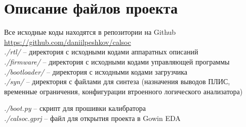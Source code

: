 \chapter{Описание файлов проекта}\label{appendix-extra-examples}%

Все исходные коды находятся в репозитории на Github \url{https://github.com/daniilpeshkov/calsoc}\\

\noindent \emph{./rtl/} -- директория с исходными кодами аппаратных описаний\\
\noindent \emph{./firmware/} -- директория с исходными кодами управляющей программы\\
\noindent \emph{./bootloader/} -- директория с исходными кодами загрузчика\\
\noindent \emph{./syn/} -- директория с файлами для синтеза (назначения выводов ПЛИС, временные ограничения, конфигурации втроенного
логического анализатора)

\noindent \emph{./boot.py} -- скрипт для прошивки калибратора\\
\noindent \emph{./calsoc.gprj} -- файл для открытия проекта в Gowin EDA\\
